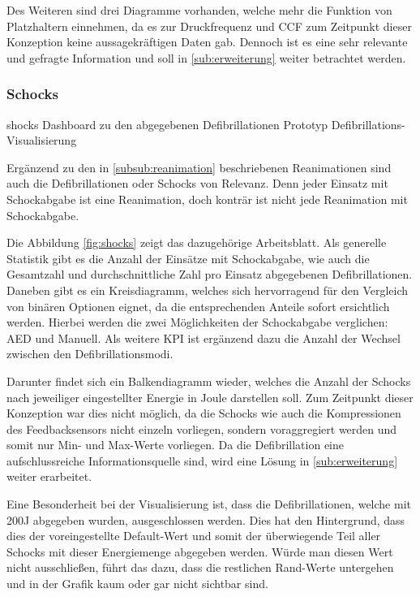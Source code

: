 Des Weiteren sind drei Diagramme vorhanden, welche mehr die Funktion von Platzhaltern einnehmen, da es zur Druckfrequenz und \gls{CCF} zum Zeitpunkt dieser Konzeption keine aussagekräftigen Daten gab.
Dennoch ist es eine sehr relevante und gefragte Information und soll in \ref{sub:erweiterung} weiter betrachtet werden.


\subsubsection{Schocks}
\label{subsub:schocks}
\bildbreit
{shocks}
{Dashboard zu den abgegebenen Defibrillationen}
{Prototyp Defibrillations-Visualisierung}

Ergänzend zu den in \ref{subsub:reanimation} beschriebenen Reanimationen sind auch die Defibrillationen oder \glqq Schocks\grqq{} von Relevanz.
Denn jeder Einsatz mit Schockabgabe ist eine Reanimation, doch konträr ist nicht jede Reanimation mit Schockabgabe.

Die Abbildung \ref{fig:shocks} zeigt das dazugehörige Arbeitsblatt.
Als generelle Statistik gibt es die Anzahl der Einsätze mit Schockabgabe, wie auch die Gesamtzahl und durchschnittliche Zahl pro Einsatz abgegebenen Defibrillationen.
Daneben gibt es ein Kreisdiagramm, welches sich hervorragend für den Vergleich von binären Optionen eignet, da die entsprechenden Anteile sofort ersichtlich werden.
Hierbei werden die zwei Möglichkeiten der Schockabgabe verglichen: \gls{AED} und Manuell.
Als weitere \gls{KPI} ist ergänzend dazu die Anzahl der Wechsel zwischen den Defibrillationsmodi.

Darunter findet sich ein Balkendiagramm wieder, welches die Anzahl der Schocks nach jeweiliger eingestellter Energie in Joule darstellen soll.
Zum Zeitpunkt dieser Konzeption war dies nicht möglich, da die Schocks wie auch die Kompressionen des Feedbacksensors nicht einzeln vorliegen, sondern voraggregiert werden und somit nur Min- und Max-Werte vorliegen.
Da die Defibrillation eine aufschlussreiche Informationsquelle sind, wird eine Lösung in \ref{sub:erweiterung} weiter erarbeitet.

Eine Besonderheit bei der Visualisierung ist, dass die Defibrillationen, welche mit 200J abgegeben wurden, ausgeschlossen werden.
Dies hat den Hintergrund, dass dies der voreingestellte Default-Wert und somit der überwiegende Teil aller Schocks mit dieser Energiemenge abgegeben werden.
Würde man diesen Wert nicht ausschließen, führt das dazu, dass die restlichen \glqq Rand\grqq{}-Werte untergehen und in der Grafik kaum oder gar nicht sichtbar sind.

